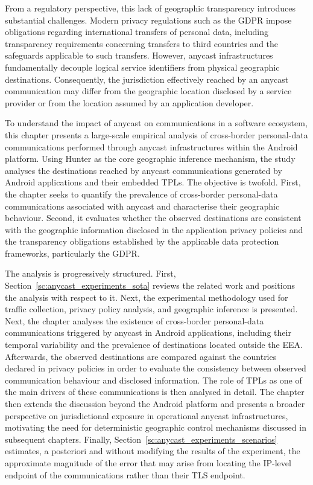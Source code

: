 From a regulatory perspective, this lack of geographic transparency introduces substantial challenges. Modern privacy regulations such as the GDPR \cite{REGULATIONSRelevance} impose obligations regarding international transfers of personal data, including transparency requirements concerning transfers to third countries and the safeguards applicable to such transfers. However, anycast infrastructures fundamentally decouple logical service identifiers from physical geographic destinations. Consequently, the jurisdiction effectively reached by an anycast communication may differ from the geographic location disclosed by a service provider or from the location assumed by an application developer.

To understand the impact of anycast on communications in a software ecosystem, this chapter presents a large-scale empirical analysis of cross-border personal-data communications performed through anycast infrastructures within the Android platform. Using Hunter as the core geographic inference mechanism, the study analyses the destinations reached by anycast communications generated by Android applications and their embedded TPLs. The objective is twofold. First, the chapter seeks to quantify the prevalence of cross-border personal-data communications associated with anycast and characterise their geographic behaviour. Second, it evaluates whether the observed destinations are consistent with the geographic information disclosed in the application privacy policies and the transparency obligations established by the applicable data protection frameworks, particularly the GDPR.

The analysis is progressively structured. First, Section~\ref{sc:anycast_experiments_sota} reviews the related work and positions the analysis with respect to it. Next, the experimental methodology used for traffic collection, privacy policy analysis, and geographic inference is presented. Next, the chapter analyses the existence of cross-border personal-data communications triggered by anycast in Android applications, including their temporal variability and the prevalence of destinations located outside the EEA. Afterwards, the observed destinations are compared against the countries declared in privacy policies in order to evaluate the consistency between observed communication behaviour and disclosed information. The role of TPLs as one of the main drivers of these communications is then analysed in detail. The chapter then extends the discussion beyond the Android platform and presents a broader perspective on jurisdictional exposure in operational anycast infrastructures, motivating the need for deterministic geographic control mechanisms discussed in subsequent chapters. Finally, Section~\ref{sc:anycast_experiments_scenarios} estimates, a posteriori and without modifying the results of the experiment, the approximate magnitude of the error that may arise from locating the IP-level endpoint of the communications rather than their TLS endpoint.

